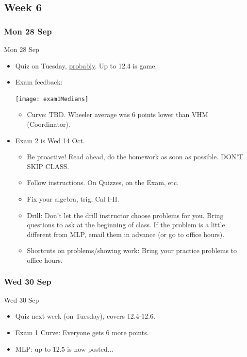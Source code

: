 \documentclass[12pt]{beamer}
\theoremstyle{plain}
\theoremstyle{definition}
\begin{document}
\subsection{Week 6}
\subsubsection{Mon 28 Sep}
\begin{frame}{Mon 28 Sep}%
\begin{itemize}
\item Quiz on Tuesday, \underline{probably}.  Up to 12.4 is game.
\item Exam feedback:

\vspace{0.5pc}
\texttt{[image: exam1Medians]}
	\begin{itemize}
	\item Curve: TBD.  Wheeler average was 6 points lower than VHM (Coordinator).
	\end{itemize}
\end{itemize}
\end{frame}

%
\begin{frame}
\begin{itemize}
\item Exam 2 is Wed 14 Oct.
	\begin{itemize}
	\item Be proactive!  Read ahead, do the homework as soon as possible.  DON'T SKIP CLASS.
	\item Follow instructions.  On Quizzes, on the Exam, etc.
	\item Fix your algebra, trig, Cal I-II.
	\item Drill: Don't let the drill instructor choose problems for you.  Bring questions to ask at the beginning of class.  If the problem is a little different from MLP, email them in advance (or go to office hours).
	\item Shortcuts on problems/showing work: Bring your practice problems to office hours.
	\end{itemize}
\end{itemize}
\end{frame}

\subsubsection{Wed 30 Sep}
\begin{frame}{Wed 30 Sep}%
\begin{itemize}
\item Quiz next week (on Tuesday), covers 12.4-12.6.  
\item Exam 1 Curve: Everyone gets 6 more points.
\item MLP: up to 12.5 is now posted...
\end{itemize}
\end{frame}
\end{document}
